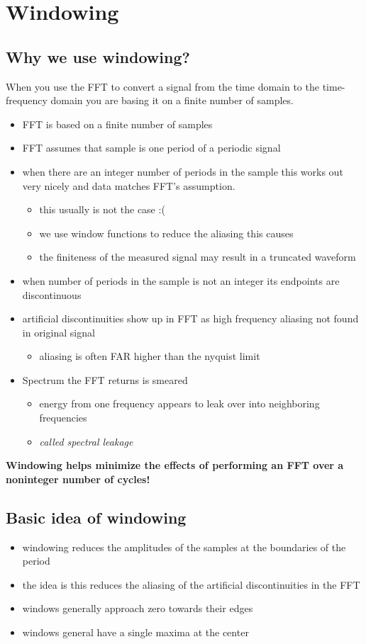 \documentclass{article}
\begin{document}
\section*{Windowing}
\subsection*{Why we use windowing?}
When you use the FFT to convert a signal from the time domain to the time-frequency domain you are basing it on a finite number of samples.

\begin{itemize}
	\item FFT is based on a finite number of samples
	\item FFT assumes that sample is one period of a periodic signal
	\item when there are an integer number of periods in the sample this works out very nicely and data matches FFT's assumption.
	\begin{itemize}
		\item this usually is not the case :(
		\item we use window functions to reduce the aliasing this causes
		\item the finiteness of the measured signal may result in a truncated waveform
	\end{itemize}
	\item when number of periods in the sample is not an integer its endpoints are discontinuous
	\item artificial discontinuities show up in FFT as high frequency aliasing not found in original signal
	\begin{itemize}
		\item aliasing is often FAR higher than the nyquist limit
	\end{itemize}
	\item Spectrum the FFT returns is smeared
	\begin{itemize}
		\item energy from one frequency appears to leak over into neighboring frequencies
		\item \textit{called spectral leakage}
	\end{itemize}
\end{itemize}
\textbf{Windowing helps minimize the effects of performing an FFT over a noninteger number of cycles!}

\subsection*{Basic idea of windowing}
\begin{itemize}
	\item windowing reduces the amplitudes of the samples at the boundaries of the period
	\item the idea is this reduces the aliasing of the artificial discontinuities in the FFT
	\item windows generally approach zero towards their edges
	\item windows general have a single maxima at the center
\end{itemize}
\end{document}
